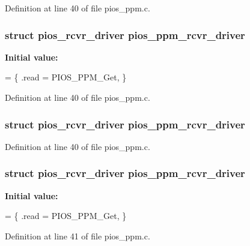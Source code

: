 Definition at line 40 of file pios\-\_\-ppm.\-c.

\hypertarget{group___p_i_o_s___p_p_m_ga45134211ce1772871927ca3a1fbc2e20}{
\subsubsection[{pios\-\_\-ppm\-\_\-rcvr\-\_\-driver}]{\setlength{\rightskip}{0pt plus 5cm}struct {\bf pios\-\_\-rcvr\-\_\-driver} pios\-\_\-ppm\-\_\-rcvr\-\_\-driver}}\label{group___p_i_o_s___p_p_m_ga45134211ce1772871927ca3a1fbc2e20}
{\bfseries Initial value\-:}
\begin{DoxyCode}
= \{
        .read = PIOS\_PPM\_Get,
\}
\end{DoxyCode}


Definition at line 40 of file pios\-\_\-ppm.\-c.

\hypertarget{group___p_i_o_s___p_p_m_ga45134211ce1772871927ca3a1fbc2e20}{
\subsubsection[{pios\-\_\-ppm\-\_\-rcvr\-\_\-driver}]{\setlength{\rightskip}{0pt plus 5cm}struct {\bf pios\-\_\-rcvr\-\_\-driver} pios\-\_\-ppm\-\_\-rcvr\-\_\-driver}}\label{group___p_i_o_s___p_p_m_ga45134211ce1772871927ca3a1fbc2e20}


Definition at line 40 of file pios\-\_\-ppm.\-c.

\hypertarget{group___p_i_o_s___p_p_m_ga45134211ce1772871927ca3a1fbc2e20}{
\subsubsection[{pios\-\_\-ppm\-\_\-rcvr\-\_\-driver}]{\setlength{\rightskip}{0pt plus 5cm}struct {\bf pios\-\_\-rcvr\-\_\-driver} pios\-\_\-ppm\-\_\-rcvr\-\_\-driver}}\label{group___p_i_o_s___p_p_m_ga45134211ce1772871927ca3a1fbc2e20}
{\bfseries Initial value\-:}
\begin{DoxyCode}
= \{
        .read = PIOS\_PPM\_Get,
\}
\end{DoxyCode}


Definition at line 41 of file pios\-\_\-ppm.\-c.

